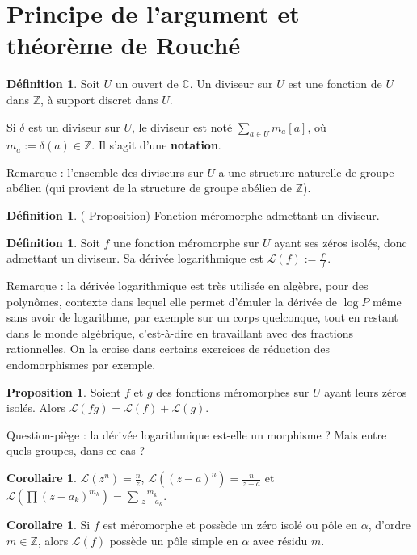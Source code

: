 \documentclass[11pt,a4paper]{book}
\newcommand{\Z}{\mathbb{Z}}
\newcommand{\C}{\mathbb{C}}
\theoremstyle{definition}
\newtheorem{proposition}[theoreme]{Proposition}
\newtheorem{corollaire}[theoreme]{Corollaire}
\newtheorem{definition}[theoreme]{D\'efinition}
\theoremstyle{plain}
\begin{document}
\section{Principe de l'argument et théorème de Rouché}

\begin{definition}
Soit $U$ un ouvert de $\C$.
Un diviseur sur $U$ est une fonction de $U$ dans $\Z$, à support discret dans $U$.
\end{definition}
Si $\delta$ est un diviseur sur $U$, le diviseur est noté $\sum_{a\in U} m_a[a]$, où $m_a := \delta(a) \in \Z$. Il s'agit d'une \textbf{notation}.

Remarque : l'ensemble des diviseurs sur $U$ a une structure naturelle de groupe abélien (qui provient de la structure de groupe abélien de $\Z$).

\begin{definition}(-Proposition)
Fonction méromorphe admettant un diviseur.
\end{definition}

\begin{definition}
Soit $f$ une fonction méromorphe sur $U$ ayant ses zéros isolés, donc admettant un diviseur. Sa dérivée logarithmique est $\mathcal L(f) := \frac{f'}{f}$.
\end{definition}

Remarque : la dérivée logarithmique est très utilisée en algèbre, pour des polynômes, contexte dans lequel elle permet d'émuler la dérivée de $\log P$ même sans avoir de logarithme, par exemple sur un corps quelconque, tout en restant dans le monde algébrique, c'est-à-dire en travaillant avec des fractions rationnelles. On la croise dans certains exercices de réduction des endomorphismes par exemple.

\begin{proposition}
Soient $f$ et $g$  des fonctions méromorphes sur $U$ ayant leurs zéros  isolés. Alors $\mathcal L(fg) = \mathcal L(f) +\mathcal L(g) $.
\end{proposition}

Question-piège : la dérivée logarithmique est-elle un morphisme ? Mais entre quels groupes, dans ce cas ?

\begin{corollaire}
$\mathcal L \left(z^n\right) = \frac{n}{z}$, $\mathcal L\left((z-a)^n\right) = \frac{n}{z-a}$ et $\mathcal L \left(\prod (z-a_k)^{m_k}\right) = \sum \frac{m_k}{z-a_k}$. 
\end{corollaire}

\begin{corollaire}
Si $f$ est méromorphe et possède un zéro isolé ou pôle en $\alpha$, d'ordre $m\in \Z$, alors $\mathcal L(f)$ possède un pôle simple en $\alpha$ avec résidu $m$.
\end{corollaire}
\end{document}
